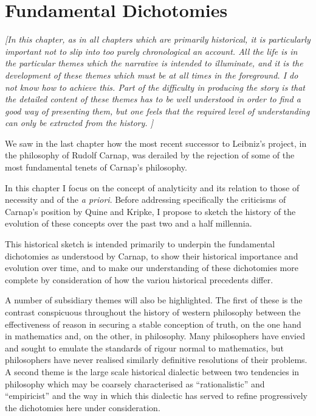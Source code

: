 \chapter{Fundamental Dichotomies}\label{FundamentalDichotomies}

{\it [In this chapter, as in all chapters which are primarily
    historical, it is particularly important not to slip into too
    purely chronological an account. 
All the life is in the particular themes which the narrative is
intended to illuminate, and it is the development of these
themes which must be at all times in the foreground. 
I do not know how to achieve this.
Part of the difficulty in producing the story is that the detailed
content of these themes has to be well understood in order to find a
good way of presenting them, but one feels that the required level of
understanding can only be extracted from the history. 
]}

We saw in the last chapter how the most recent successor to
Leibniz's project, in the philosophy of Rudolf
Carnap, was derailed by the rejection of some of
the most fundamental tenets of Carnap's philosophy. 

In this chapter I focus on the concept of analyticity and
its relation to those of necessity and of the {\it a priori}.
Before addressing specifically the criticisms of Carnap's position by
Quine and Kripke, I propose to sketch the history of the evolution of
these concepts over the past two and a half millennia.

This historical sketch is intended primarily to underpin the
fundamental dichotomies as understood by Carnap, to show their
historical importance and evolution over time, and to make our
understanding of these dichotomies more complete by consideration of
how the variou historical precedents differ.

A number of subsidiary themes will also be highlighted.
The first of these is the contrast conspicuous throughout the history of
western philosophy between the effectiveness of reason in securing a
stable conception of truth, on the one hand in mathematics and, on the
other, in philosophy.
Many philosophers have envied and sought to emulate the standards of
rigour normal to mathematics, but philosophers have never realised
similarly definitive resolutions of their problems.
A second theme is the large scale historical dialectic between two
tendencies in philosophy which may be coarsely characterised as
``rationalistic'' and ``empiricist'' and the way in which this
dialectic has served to refine progressively the dichotomies here
under consideration.


